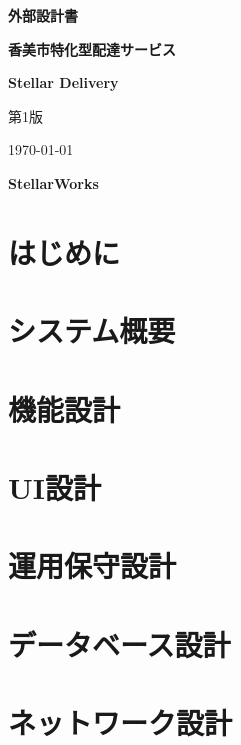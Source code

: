 \documentclass{jlreq}
\begin{document}
\begin{titlepage}
  \centering
  \vspace{2cm}
  {\LARGE \bfseries 外部設計書 \par}
  \vspace{1cm}
  {\LARGE \bfseries 香美市特化型配達サービス \par}
  \vspace{1cm}
   {\LARGE \bfseries Stellar Delivery \par}
  \vspace{3cm}
  {\Large 第1版 \par}
  \vspace{4cm}
  {\Large \today \par}
  \vspace{0.5cm}
  {\LARGE \bfseries StellarWorks \par}
  \vfill
\end{titlepage}

\newpage

\tableofcontents
\newpage


\section{はじめに}


\section{システム概要}


\section{機能設計}


\section{UI設計}


\section{運用保守設計}


\section{データベース設計}


\section{ネットワーク設計}

\end{document}
